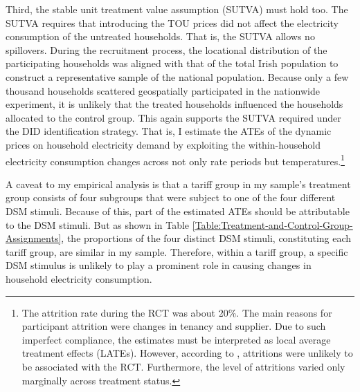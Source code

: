 {Third, the stable unit treatment value assumption (SUTVA) must hold too. The SUTVA requires that introducing the TOU prices did not affect the electricity consumption of the untreated households. That is, the SUTVA allows no spillovers. During the recruitment process, the locational distribution of the participating households was aligned with that of the total Irish population to construct a representative sample of the national population. Because only a few thousand households scattered geospatially participated in the nationwide experiment, it is unlikely that the treated households influenced the households allocated to the control group. This again supports the SUTVA required under the DID identification strategy.} That is, I estimate the ATEs of the dynamic prices on household electricity demand by exploiting the within-household electricity consumption changes across not only rate periods but temperatures.\footnote{The attrition rate during the RCT was about 20\%. The main reasons for participant attrition were changes in tenancy and supplier. Due to such imperfect compliance, the estimates must be interpreted as local average treatment effects (LATEs). However, according to \cite{Electricity-Smart-Metering-Customer-Behaviour-Trials-Findings-Report_CER_2011}, attritions were unlikely to be associated with the RCT. Furthermore, the level of attritions varied only marginally across treatment status.}

A caveat to my empirical analysis is that a tariff group in my sample's treatment group consists of four subgroups that were subject to one of the four different DSM stimuli. Because of this, part of the estimated ATEs should be attributable to the DSM stimuli. But as shown in Table \ref{Table:Treatment-and-Control-Group-Assignments}, the proportions of the four distinct DSM stimuli, constituting each tariff group, are similar in my sample. Therefore, within a tariff group, a specific DSM stimulus is unlikely to play a prominent role in causing changes in household electricity consumption. 
